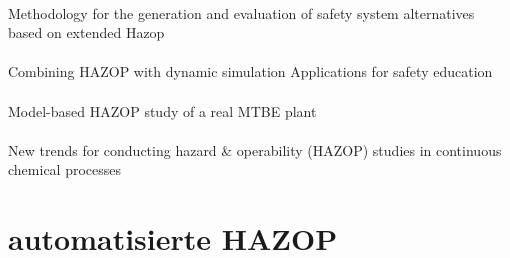 \paragraph*{\cite{Ramzan_2007}} Methodology for the generation and evaluation of safety system alternatives based on extended Hazop

\paragraph*{\cite{Eizenberg_2006}} Combining {HAZOP} with dynamic simulation {\textemdash} Applications for safety education

\paragraph*{\cite{Labovsk__2007}} Model-based {HAZOP} study of a real {MTBE} plant

\paragraph*{\cite{Denti_2010}} New trends for conducting hazard \& operability (HAZOP) studies in continuous chemical processes

\section{automatisierte HAZOP}
%
%

